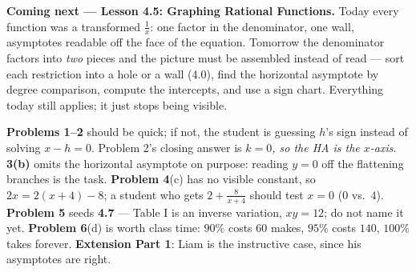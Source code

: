 \documentclass[10pt]{article}
\begin{document}
\begin{spiralbox}
\textbf{Coming next --- Lesson 4.5: Graphing Rational Functions.} Today every function was a
transformed $\frac1x$: one factor in the denominator, one wall, asymptotes readable off the face of the
equation. Tomorrow the denominator factors into \emph{two} pieces and the picture must be assembled
instead of read --- sort each restriction into a hole or a wall (4.0), find the horizontal asymptote by
degree comparison, compute the intercepts, and use a sign chart. Everything today still applies; it
just stops being visible.
\end{spiralbox}

\begin{teachernote}
\textbf{Problems 1--2} should be quick; if not, the student is guessing $h$'s sign instead of solving
$x-h=0$. Problem 2's closing answer is \emph{$k=0$, so the HA is the $x$-axis}. \textbf{3(b)} omits the
horizontal asymptote on purpose: reading $y=0$ off the flattening branches is the task.
\textbf{Problem 4}(c) has no visible constant, so $2x=2(x+4)-8$; a student who gets $2+\frac{8}{x+4}$
should test $x=0$ ($0$ vs.\ $4$). \textbf{Problem 5} seeds \textbf{4.7} --- Table I is an inverse
variation, $xy=12$; do not name it yet. \textbf{Problem 6}(d) is worth class time: $90\%$ costs $60$
makes, $95\%$ costs $140$, $100\%$ takes forever. \textbf{Extension Part 1}: Liam is the instructive
case, since his asymptotes are right.
\end{teachernote}
\end{document}
